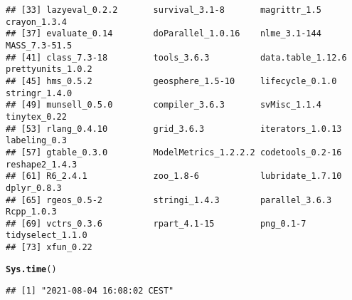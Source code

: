 \documentclass{article}\usepackage[]{graphicx}\usepackage[]{color}
\makeatletter
\newcommand{\hlstd}[1]{\textcolor[rgb]{0.345,0.345,0.345}{#1}}%
\newcommand{\hlkwd}[1]{\textcolor[rgb]{0.737,0.353,0.396}{\textbf{#1}}}%
\newenvironment{kframe}{%
 \def\at@end@of@kframe{}%
 \ifinner\ifhmode%
  \def\at@end@of@kframe{\end{minipage}}%
  \begin{minipage}{\columnwidth}%
 \fi\fi%
 \def\FrameCommand##1{\hskip\@totalleftmargin \hskip-\fboxsep
 \colorbox{shadecolor}{##1}\hskip-\fboxsep
     \hskip-\linewidth \hskip-\@totalleftmargin \hskip\columnwidth}%
 \MakeFramed {\advance\hsize-\width
   \@totalleftmargin\z@ \linewidth\hsize
   \@setminipage}}%
 {\par\unskip\endMakeFramed%
 \at@end@of@kframe}
\newenvironment{knitrout}{}{} %
\makeatother
\begin{document}
\begin{knitrout}
\begin{kframe}
\begin{verbatim}
## [33] lazyeval_0.2.2       survival_3.1-8       magrittr_1.5         crayon_1.3.4        
## [37] evaluate_0.14        doParallel_1.0.16    nlme_3.1-144         MASS_7.3-51.5       
## [41] class_7.3-18         tools_3.6.3          data.table_1.12.6    prettyunits_1.0.2   
## [45] hms_0.5.2            geosphere_1.5-10     lifecycle_0.1.0      stringr_1.4.0       
## [49] munsell_0.5.0        compiler_3.6.3       svMisc_1.1.4         tinytex_0.22        
## [53] rlang_0.4.10         grid_3.6.3           iterators_1.0.13     labeling_0.3        
## [57] gtable_0.3.0         ModelMetrics_1.2.2.2 codetools_0.2-16     reshape2_1.4.3      
## [61] R6_2.4.1             zoo_1.8-6            lubridate_1.7.10     dplyr_0.8.3         
## [65] rgeos_0.5-2          stringi_1.4.3        parallel_3.6.3       Rcpp_1.0.3          
## [69] vctrs_0.3.6          rpart_4.1-15         png_0.1-7            tidyselect_1.1.0    
## [73] xfun_0.22
\end{verbatim}
\begin{alltt}
\hlkwd{Sys.time}\hlstd{()}
\end{alltt}
\begin{verbatim}
## [1] "2021-08-04 16:08:02 CEST"
\end{verbatim}
\end{kframe}
\end{knitrout}
\end{document}
